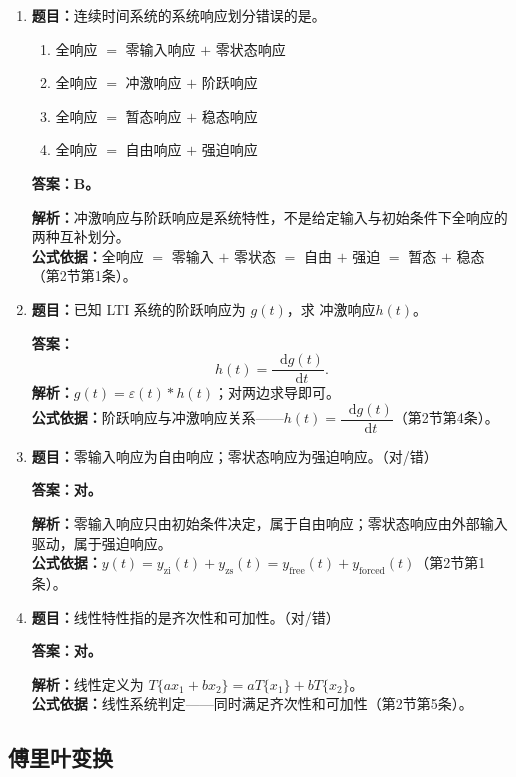 \documentclass[12pt,a4paper]{ctexart}
\newcommand{\eps}{\varepsilon}
\newcommand{\dif}{\mathop{}\!\mathrm{d}}
\begin{document}
\begin{enumerate}[label=\arabic*.]
\item \textbf{题目：}连续时间系统的系统响应划分错误的是\underline{\hspace{1.5cm}}。
\begin{enumerate}[label=\Alph*.]
\item 全响应 $=$ 零输入响应 $+$ 零状态响应
\item 全响应 $=$ 冲激响应 $+$ 阶跃响应
\item 全响应 $=$ 暂态响应 $+$ 稳态响应
\item 全响应 $=$ 自由响应 $+$ 强迫响应
\end{enumerate}
\textbf{答案：B。}\par
\textbf{解析：}冲激响应与阶跃响应是系统特性，不是给定输入与初始条件下全响应的两种互补划分。\\
\textbf{公式依据：}全响应 $=$ 零输入 $+$ 零状态 $=$ 自由 $+$ 强迫 $=$ 暂态 $+$ 稳态（第2节第1条）。

\item \textbf{题目：}已知 LTI 系统的阶跃响应为 $g(t)$，求 冲激响应$h(t)$。\par
\textbf{答案：}
\[
\boxed{h(t)=\frac{\dif g(t)}{\dif t}.}
\]
\textbf{解析：}$g(t)=\eps(t)*h(t)$；对两边求导即可。\\
\textbf{公式依据：}阶跃响应与冲激响应关系——$h(t)=\dfrac{\dif g(t)}{\dif t}$（第2节第4条）。

\item \textbf{题目：}零输入响应为自由响应；零状态响应为强迫响应。（对/错）\par
\textbf{答案：对。}\par
\textbf{解析：}零输入响应只由初始条件决定，属于自由响应；零状态响应由外部输入驱动，属于强迫响应。\\
\textbf{公式依据：}$y(t)=y_{\mathrm{zi}}(t)+y_{\mathrm{zs}}(t)=y_{\mathrm{free}}(t)+y_{\mathrm{forced}}(t)$（第2节第1条）。

\item \textbf{题目：}线性特性指的是齐次性和可加性。（对/错）\par
\textbf{答案：对。}\par
\textbf{解析：}线性定义为 \(\displaystyle T\{a x_1+b x_2\}=aT\{x_1\}+bT\{x_2\}\)。\\
\textbf{公式依据：}线性系统判定——同时满足齐次性和可加性（第2节第5条）。
\end{enumerate}

\subsection{傅里叶变换}
\end{document}
